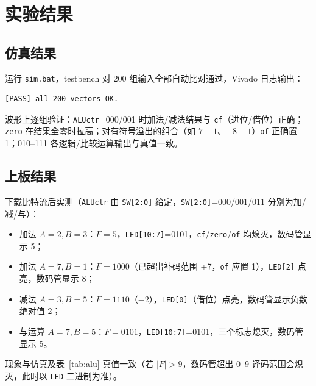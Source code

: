 \documentclass[12pt, a4paper]{ctexart}
\begin{document}
\section{实验结果}

\subsection{仿真结果}
运行 \texttt{sim.bat}，testbench 对 200 组输入全部自动比对通过，Vivado 日志输出：
\begin{verbatim}
[PASS] all 200 vectors OK.
\end{verbatim}
波形上逐组验证：\texttt{ALUctr}=000/001 时加法/减法结果与 \texttt{cf}（进位/借位）正确；\texttt{zero} 在结果全零时拉高；对有符号溢出的组合（如 $7+1$、$-8-1$）\texttt{of} 正确置 1；010--111 各逻辑/比较运算输出与真值一致。


\subsection{上板结果}
下载比特流后实测（\texttt{ALUctr} 由 \texttt{SW[2:0]} 给定，\texttt{SW[2:0]}=000/001/011 分别为加/减/与）：
\begin{itemize}
    \item 加法 $A=2,B=3$：$F=5$，\texttt{LED[10:7]}=0101，\texttt{cf}/\texttt{zero}/\texttt{of} 均熄灭，数码管显示 5；
    \item 加法 $A=7,B=1$：$F=1000$（已超出补码范围 +7，\texttt{of} 应置 1），\texttt{LED[2]} 点亮，数码管显示 8；
    \item 减法 $A=3,B=5$：$F=1110$（$-2$），\texttt{LED[0]}（借位）点亮，数码管显示负数绝对值 2；
    \item 与运算 $A=7,B=5$：$F=0101$，\texttt{LED[10:7]}=0101，三个标志熄灭，数码管显示 5。
\end{itemize}
现象与仿真及表~\ref{tab:alu} 真值一致（若 $|F|>9$，数码管超出 0--9 译码范围会熄灭，此时以 \texttt{LED} 二进制为准）。

\end{document}
